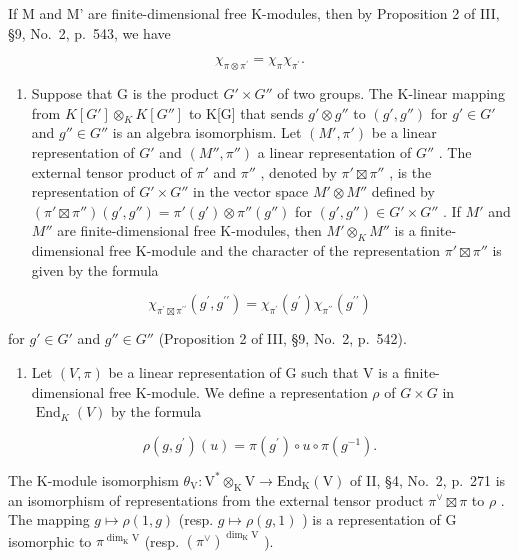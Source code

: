 If M and M' are finite-dimensional free K-modules, then by Proposition 2 of III, §9, No.~2, p.~543, we have

\[
\chi_ {\pi \otimes \pi^ {\prime}} = \chi_ {\pi} \chi_ {\pi^ {\prime}}.\tag{3}
\]

\begin{enumerate}
\def\labelenumi{\arabic{enumi})}
\setcounter{enumi}{4}
\tightlist
\item
  Suppose that G is the product \(G' \times G''\) of two groups. The K-linear mapping from \(K[G'] \otimes_{K} K[G'']\) to K{[}G{]} that sends \(g' \otimes g''\) to \((g', g'')\) for \(g' \in G'\) and \(g'' \in G''\) is an algebra isomorphism. Let \((M', \pi')\) be a linear representation of \(G'\) and \((M'', \pi'')\) a linear representation of \(G''\) . The external tensor product of \(\pi'\) and \(\pi''\) , denoted by \(\pi' \boxtimes \pi''\) , is the representation of \(G' \times G''\) in the vector space \(M' \otimes M''\) defined by \((\pi' \boxtimes \pi'')(g', g'') = \pi'(g') \otimes \pi''(g'')\) for \((g', g'') \in G' \times G''\) . If \(M'\) and \(M''\) are finite-dimensional free K-modules, then \(M' \otimes_{K} M''\) is a finite-dimensional free K-module and the character of the representation \(\pi' \boxtimes \pi''\) is given by the formula
\end{enumerate}

\[
\chi_ {\pi^ {\prime} \boxtimes \pi^ {\prime \prime}} (g ^ {\prime}, g ^ {\prime \prime}) = \chi_ {\pi^ {\prime}} (g ^ {\prime}) \chi_ {\pi^ {\prime \prime}} (g ^ {\prime \prime})
\]

for \(g' \in G'\) and \(g'' \in G''\) (Proposition 2 of III, §9, No.~2, p.~542).

\begin{enumerate}
\def\labelenumi{\arabic{enumi})}
\setcounter{enumi}{5}
\tightlist
\item
  Let \((V,\pi)\) be a linear representation of G such that V is a finite-dimensional free K-module. We define a representation \(\rho\) of \(G\times G\) in \(\operatorname{End}_{K}(V)\) by the formula
\end{enumerate}

\[
\rho (g, g ^ {\prime}) (u) = \pi (g ^ {\prime}) \circ u \circ \pi (g ^ {- 1}).
\]

The K-module isomorphism \(\theta_{\mathrm{V}}: \mathrm{V}^{*} \otimes_{\mathrm{K}} \mathrm{V} \to \mathrm{End}_{\mathrm{K}}(\mathrm{V})\) of II, §4, No.~2, p.~271 is an isomorphism of representations from the external tensor product \(\pi^{\vee} \boxtimes \pi\) to \(\rho\) . The mapping \(g \mapsto \rho(1, g)\) (resp. \(g \mapsto \rho(g, 1)\) ) is a representation of G isomorphic to \(\pi^{\dim_{\mathrm{K}} \mathrm{V}}\) (resp. \((\pi^{\vee})^{\dim_{\mathrm{K}} \mathrm{V}}\) ).

